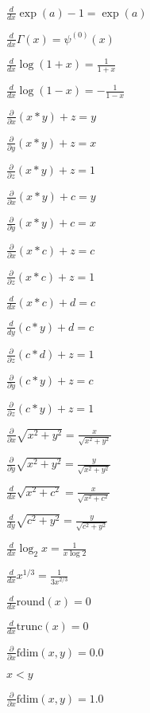 \documentclass{article}
\begin{document}
$\frac{d}{dx} \exp(a) - 1 = \exp(a)$
\pagebreak

$\frac{d}{dx} \Gamma(x) = \psi^{(0)}(x)$
\pagebreak

$\frac{d}{dx} \log (1 + x) = \frac{1}{1 + x}$
\pagebreak

$\frac{d}{dx} \log (1 - x) = -\frac{1}{1 - x}$
\pagebreak

$\frac{\partial}{\partial x} (x * y) + z = y$
\pagebreak

$\frac{\partial}{\partial y} (x * y) + z = x$
\pagebreak

$\frac{\partial}{\partial z} (x * y) + z = 1$
\pagebreak

$\frac{\partial}{\partial x} (x * y) + c = y$
\pagebreak

$\frac{\partial}{\partial y} (x * y) + c = x$
\pagebreak

$\frac{\partial}{\partial x} (x * c) + z = c$
\pagebreak

$\frac{\partial}{\partial z} (x * c) + z = 1$
\pagebreak

$\frac{d}{d x} (x * c) + d = c$
\pagebreak

$\frac{d}{d y} (c * y) + d = c$
\pagebreak

$\frac{\partial}{\partial z} (c * d) + z = 1$
\pagebreak

$\frac{\partial}{\partial y} (c * y) + z = c$
\pagebreak

$\frac{\partial}{\partial z} (c * y) + z = 1$
\pagebreak

$\frac{\partial}{\partial x} \sqrt{x^2 + y^2} = \frac{x}{\sqrt{x^2 + y^2}}$
\pagebreak

$\frac{\partial}{\partial y} \sqrt{x^2 + y^2} = \frac{y}{\sqrt{x^2 + y^2}}$
\pagebreak

$\frac{d}{d x} \sqrt{x^2 + c^2} = \frac{x}{\sqrt{x^2 + c^2}}$
\pagebreak

$\frac{d}{d y} \sqrt{c^2 + y^2} = \frac{y}{\sqrt{c^2 + y^2}}$
\pagebreak

$\frac{d}{dx} \log_2 x = \frac{1}{x \log 2}$
\pagebreak

$\frac{d}{dx} x^{1/3} = \frac{1}{3 x^{2/3}}$
\pagebreak

$\frac{d}{dx} \mbox{round}(x) = 0$
\pagebreak

$\frac{d}{dx} \mbox{trunc}(x) = 0$
\pagebreak

$\frac{\partial}{\partial x} \mbox{fdim}(x,y) = 0.0$
\pagebreak

$x < y$
\pagebreak

$\frac{\partial}{\partial x} \mbox{fdim}(x,y) = 1.0$
\pagebreak
\end{document}
